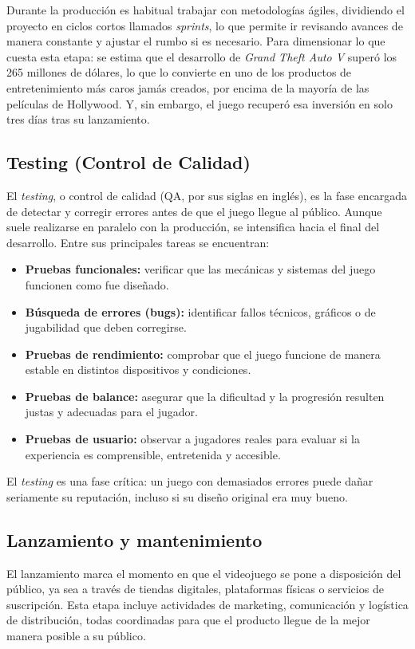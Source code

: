 \documentclass[12pt]{report}
\begin{document}
Durante la producción es habitual trabajar con metodologías ágiles, dividiendo el proyecto en ciclos cortos llamados \textit{sprints}, lo que permite ir revisando avances de manera constante y ajustar el rumbo si es necesario. Para dimensionar lo que cuesta esta etapa: se estima que el desarrollo de \textit{Grand Theft Auto V} superó los 265 millones de dólares, lo que lo convierte en uno de los productos de entretenimiento más caros jamás creados, por encima de la mayoría de las películas de Hollywood. Y, sin embargo, el juego recuperó esa inversión en solo tres días tras su lanzamiento.

\subsection{Testing (Control de Calidad)}
El \textit{testing}, o control de calidad (QA, por sus siglas en inglés), es la fase encargada de detectar y corregir errores antes de que el juego llegue al público. Aunque suele realizarse en paralelo con la producción, se intensifica hacia el final del desarrollo. Entre sus principales tareas se encuentran:

\begin{itemize}
    \item \textbf{Pruebas funcionales:} verificar que las mecánicas y sistemas del juego funcionen como fue diseñado.
    \item \textbf{Búsqueda de errores (bugs):} identificar fallos técnicos, gráficos o de jugabilidad que deben corregirse.
    \item \textbf{Pruebas de rendimiento:} comprobar que el juego funcione de manera estable en distintos dispositivos y condiciones.
    \item \textbf{Pruebas de balance:} asegurar que la dificultad y la progresión resulten justas y adecuadas para el jugador.
    \item \textbf{Pruebas de usuario:} observar a jugadores reales para evaluar si la experiencia es comprensible, entretenida y accesible.
\end{itemize}

El \textit{testing} es una fase crítica: un juego con demasiados errores puede dañar seriamente su reputación, incluso si su diseño original era muy bueno.

\subsection{Lanzamiento y mantenimiento}
El lanzamiento marca el momento en que el videojuego se pone a disposición del público, ya sea a través de tiendas digitales, plataformas físicas o servicios de suscripción. Esta etapa incluye actividades de marketing, comunicación y logística de distribución, todas coordinadas para que el producto llegue de la mejor manera posible a su público.
\end{document}
